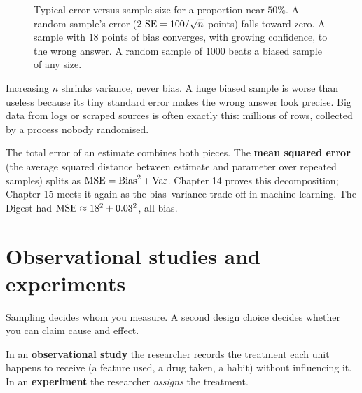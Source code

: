 \begin{figure}[H]
\caption{Typical error versus sample size for a proportion near $50\%$. A random
sample's error ($2\,\operatorname{SE} = 100/\sqrt n$ points) falls toward zero. A sample with $18$
points of bias converges, with growing confidence, to the wrong answer. A random sample
of $1000$ beats a biased sample of any size.}
\label{fig:sampling-size-vs-bias}
\end{figure}

\begin{happeningbox}
Increasing $n$ shrinks variance, never bias. A huge biased sample is worse than useless
because its tiny standard error makes the wrong answer look precise. Big data from logs
or scraped sources is often exactly this: millions of rows, collected by a process
nobody randomised.
\end{happeningbox}

\begin{connectionbox}
The total error of an estimate combines both pieces. The \textbf{mean squared error}
(the average squared distance between estimate and parameter over repeated samples)
splits as $\operatorname{MSE} = \operatorname{Bias}^2 + \operatorname{Var}$. Chapter 14 proves this decomposition; Chapter 15 meets it again
as the bias--variance trade-off in machine learning. The Digest had
$\operatorname{MSE} \approx 18^2 + 0.03^2$, all bias.
\end{connectionbox}

\section{Observational studies and experiments}
\label{sec:sampling-obs-exp}

Sampling decides whom you measure. A second design choice decides whether you can claim
cause and effect.

\begin{definition}
In an \textbf{observational study} the researcher records the treatment each unit
happens to receive (a feature used, a drug taken, a habit) without influencing it. In an
\textbf{experiment} the researcher \emph{assigns} the treatment.
\end{definition}

